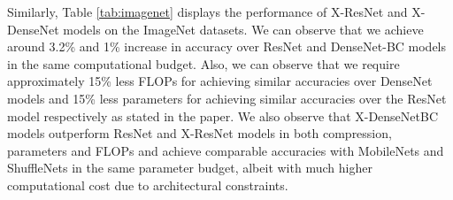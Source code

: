 \noindent Similarly, Table \ref{tab:imagenet} displays the performance of X-ResNet and X-DenseNet models on the ImageNet datasets. We can observe that we achieve around 3.2\% and 1\% increase in accuracy over ResNet and DenseNet-BC models in the same computational budget. Also, we can observe that we require approximately 15\% less FLOPs for achieving similar accuracies over DenseNet models and 15\% less parameters for achieving similar accuracies over the ResNet model respectively as stated in the paper. We also observe that X-DenseNetBC models outperform ResNet and X-ResNet models in both compression, parameters and FLOPs and achieve comparable accuracies with MobileNets \cite{howard2017mobilenets} and ShuffleNets \cite{zhang2017shufflenet} in the same parameter budget, albeit with much higher computational cost due to architectural constraints. \\

